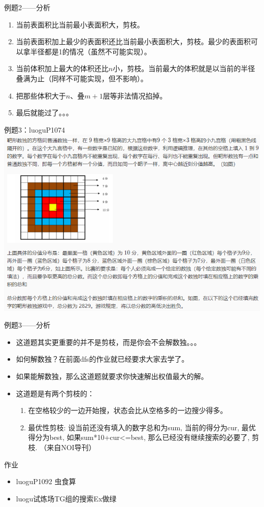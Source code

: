 \documentclass{beamer}[UTF-8]
\begin{document}
\begin{frame}{例题2——分析}
  \pause
\begin{enumerate}
  \item 当前表面积比当前最小表面积大，剪枝。 \pause
  \item 当前表面积加上最少的表面积还比当前最小表面积大，剪枝。最少的表面积可以拿半径都是1的情况（虽然不可能实现）。 \pause
  \item 当前体积加上最大的体积还比$n$小，剪枝。当前最大的体积就是以当前的半径叠满为止（同样不可能实现，但不影响）。 \pause
  \item 把那些体积大于$n$、叠$m+1$层等非法情况掐掉。 \pause
  \item 最后就能过了。。。
\end{enumerate}
\end{frame}

\begin{frame}{例题3：luoguP1074}
\includegraphics[width=\textwidth, height=\textheight]{luoguP1074.png}
\end{frame}

\begin{frame}{例题3——分析}
  \pause
\begin{itemize}
  \item 这道题其实更重要的并不是剪枝，而是你会不会解数独。。。 \pause
  \item 如何解数独？在前面dfs的作业就已经要求大家去学了。 \pause
  \item 如果能解数独，那么这道题就要求你快速解出权值最大的解。 \pause
  \item 这道题是有两个剪枝的： \pause
  \begin{enumerate}
  \item 在空格较少的一边开始搜，状态会比从空格多的一边搜少得多。 \pause
  \item 最优性剪枝: 设当前还没有填入的数字总和为sum, 当前的得分为cur, 最优得分为best, 如果sum*10+cur<=best, 那么已经没有继续搜索的必要了, 剪枝. （来自NOI导刊）\pause
  \end{enumerate}
\end{itemize}
\end{frame}

\begin{frame}{作业}
\begin{itemize}
  \item luoguP1092 虫食算
  \item luogu试炼场TG组的搜索Ex做绿
\end{itemize}
\end{frame}
\end{document}
